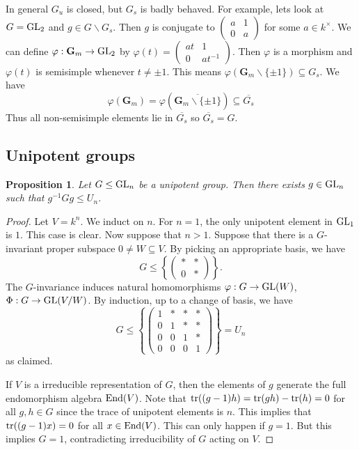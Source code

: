 \documentclass[]{pcmi}
\theoremstyle{plain}
\newtheorem{Proposition}[equation]{Proposition}
\theoremstyle{definition}
\begin{document}
In general $G_u$ is closed, but $G_s$ is badly behaved. For example, lets look at $G = \operatorname{GL}_2$ and $g \in G \backslash G_s$. Then $g$ is conjugate to $\begin{pmatrix} a & 1 \\ 0 & a \end{pmatrix}$ for some $a \in k^\times$. We can define $\varphi : \mathbf{G}_m \to \operatorname{GL}_2$ by $\varphi(t) = \begin{pmatrix} at & 1 \\ 0 & at^{-1} \end{pmatrix}$. Then $\varphi$ is a morphism and $\varphi(t)$ is semisimple whenever $t \neq \pm 1$. This means $\varphi(\mathbf{G}_m \backslash \{\pm 1\}) \subseteq G_s$. We have 
\[
    \varphi(\mathbf{G}_m) = \varphi \left ( \overline{\mathbf{G}_m \backslash \{ \pm 1 \}} \right ) \subseteq \overline{G_s}
\]
Thus all non-semisimple elements lie in $\overline{G_s}$ so $\overline{G_s} = G$.

\subsection{Unipotent groups}

\begin{Proposition}
    Let $G \leq \operatorname{GL}_n$ be a unipotent group. Then there exists $g \in \operatorname{GL}_n$ such that $g^{-1} G g \leq U_n$. 
\end{Proposition}

\begin{proof}
    Let $V = k^n$. We induct on $n$. For $n = 1$, the only unipotent element in $\operatorname{GL}_1$ is $1$. This case is clear. Now suppose that $n > 1$. Suppose that there is a $G$-invariant proper subspace $0 \neq W \subseteq V$. By picking an appropriate basis, we have 
    \[
        G \leq \left \{\begin{pmatrix} * & * \\ 0 & * \end{pmatrix} \right \}.
    \]  
    The $G$-invariance induces natural homomorphisms $\varphi : G \to \operatorname{GL}(W)$, $\Phi : G \to \operatorname{GL}(V/W)$. By induction, up to a change of basis, we have 
    \[
        G \leq \left \{ 
        \begin{pmatrix}
            1 & * & * & * \\
            0 & 1 & * & * \\
            0 & 0 & 1 & * \\
            0 & 0 & 0 & 1
        \end{pmatrix} \right \} = U_n
    \]
    as claimed. 
    
    If $V$ is a irreducible representation of $G$, then the elements of $g$ generate the full endomorphism algebra $\operatorname{End}(V)$. Note that $\operatorname{tr}((g-1)h) = \operatorname{tr}(gh) - \operatorname{tr}(h) = 0$ for all $g, h \in G$ since the trace of unipotent elements is $n$. This implies that $\operatorname{tr}((g-1)x) = 0$ for all $x \in \operatorname{End}(V)$. This can only happen if $g = 1$. But this implies $G = 1$, contradicting irreducibility of $G$ acting on $V$. 
\end{proof}
\appendix
\end{document}
